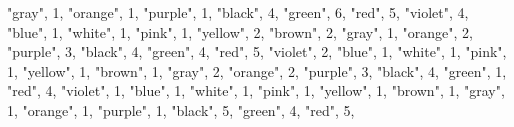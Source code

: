 \documentclass[
]{article}
\newenvironment{Shaded}{\begin{snugshade}}{\end{snugshade}}
\newcommand{\DecValTok}[1]{\textcolor[rgb]{0.00,0.00,0.81}{#1}}
\newcommand{\NormalTok}[1]{#1}
\newcommand{\StringTok}[1]{\textcolor[rgb]{0.31,0.60,0.02}{#1}}
\begin{document}
\begin{Shaded}
\begin{Highlighting}[]
  \StringTok{"gray"}\NormalTok{, }\DecValTok{1}\NormalTok{,}
  \StringTok{"orange"}\NormalTok{, }\DecValTok{1}\NormalTok{,}
  \StringTok{"purple"}\NormalTok{, }\DecValTok{1}\NormalTok{,}
    \StringTok{"black"}\NormalTok{, }\DecValTok{4}\NormalTok{,}
  \StringTok{"green"}\NormalTok{, }\DecValTok{6}\NormalTok{,}
  \StringTok{"red"}\NormalTok{, }\DecValTok{5}\NormalTok{,}
  \StringTok{"violet"}\NormalTok{, }\DecValTok{4}\NormalTok{,}
  \StringTok{"blue"}\NormalTok{, }\DecValTok{1}\NormalTok{,}
  \StringTok{"white"}\NormalTok{, }\DecValTok{1}\NormalTok{,}
  \StringTok{"pink"}\NormalTok{, }\DecValTok{1}\NormalTok{,}
  \StringTok{"yellow"}\NormalTok{, }\DecValTok{2}\NormalTok{,}
  \StringTok{"brown"}\NormalTok{, }\DecValTok{2}\NormalTok{,}
  \StringTok{"gray"}\NormalTok{, }\DecValTok{1}\NormalTok{,}
  \StringTok{"orange"}\NormalTok{, }\DecValTok{2}\NormalTok{,}
  \StringTok{"purple"}\NormalTok{, }\DecValTok{3}\NormalTok{,}
    \StringTok{"black"}\NormalTok{, }\DecValTok{4}\NormalTok{,}
  \StringTok{"green"}\NormalTok{, }\DecValTok{4}\NormalTok{, }
  \StringTok{"red"}\NormalTok{, }\DecValTok{5}\NormalTok{,}
  \StringTok{"violet"}\NormalTok{, }\DecValTok{2}\NormalTok{,}
  \StringTok{"blue"}\NormalTok{, }\DecValTok{1}\NormalTok{,}
  \StringTok{"white"}\NormalTok{, }\DecValTok{1}\NormalTok{,}
  \StringTok{"pink"}\NormalTok{, }\DecValTok{1}\NormalTok{,}
  \StringTok{"yellow"}\NormalTok{, }\DecValTok{1}\NormalTok{,}
  \StringTok{"brown"}\NormalTok{, }\DecValTok{1}\NormalTok{,}
  \StringTok{"gray"}\NormalTok{, }\DecValTok{2}\NormalTok{,}
  \StringTok{"orange"}\NormalTok{, }\DecValTok{2}\NormalTok{,}
  \StringTok{"purple"}\NormalTok{, }\DecValTok{3}\NormalTok{,}
    \StringTok{"black"}\NormalTok{, }\DecValTok{4}\NormalTok{,}
  \StringTok{"green"}\NormalTok{, }\DecValTok{1}\NormalTok{,}
  \StringTok{"red"}\NormalTok{, }\DecValTok{4}\NormalTok{,}
  \StringTok{"violet"}\NormalTok{, }\DecValTok{1}\NormalTok{,}
  \StringTok{"blue"}\NormalTok{, }\DecValTok{1}\NormalTok{,}
  \StringTok{"white"}\NormalTok{, }\DecValTok{1}\NormalTok{,}
  \StringTok{"pink"}\NormalTok{, }\DecValTok{1}\NormalTok{,}
  \StringTok{"yellow"}\NormalTok{, }\DecValTok{1}\NormalTok{,}
  \StringTok{"brown"}\NormalTok{, }\DecValTok{1}\NormalTok{,}
  \StringTok{"gray"}\NormalTok{, }\DecValTok{1}\NormalTok{,}
  \StringTok{"orange"}\NormalTok{, }\DecValTok{1}\NormalTok{,}
  \StringTok{"purple"}\NormalTok{, }\DecValTok{1}\NormalTok{,}
    \StringTok{"black"}\NormalTok{, }\DecValTok{5}\NormalTok{,}
  \StringTok{"green"}\NormalTok{, }\DecValTok{4}\NormalTok{,}
  \StringTok{"red"}\NormalTok{, }\DecValTok{5}\NormalTok{,}

\end{Highlighting}
\end{Shaded}
\end{document}
